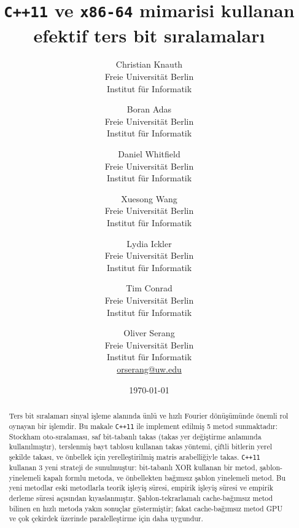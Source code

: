 \documentclass[10pt]{article}
\begin{document}
\title{{\tt C++11} ve {\tt x86-64} mimarisi kullanan efektif ters bit s{\i}ralamalar{\i}}

\author{Christian Knauth\\
Freie Universit\"at Berlin\\
Institut f\"{u}r Informatik
\and
Boran Adas\\
Freie Universit\"at Berlin\\
Institut f\"{u}r Informatik
\and
Daniel Whitfield\\
Freie Universit\"at Berlin\\
Institut f\"{u}r Informatik
\and
Xuesong Wang\\
Freie Universit\"at Berlin\\
Institut f\"{u}r Informatik
\and
Lydia Ickler\\
Freie Universit\"at Berlin\\
Institut f\"{u}r Informatik
\and
Tim Conrad\\
Freie Universit\"at Berlin\\
Institut f\"{u}r Informatik
\and
Oliver Serang\\
Freie Universit\"at Berlin\\
Institut f\"{u}r Informatik\\
\url{orserang@uw.edu}
}

\date{{\small \today}}

\maketitle

\begin{abstract}
\noindent Ters bit s{\i}ralamar{\i} sinyal i\c{s}leme alan{\i}nda \"{u}nl\"{u} ve h{\i}zl{\i} Fourier
 d\"{o}n\"{u}\c{s}\"{u}m\"{u}nde \"{o}nemli rol oynayan bir i\c{s}lemdir. Bu makale {\tt C++11} ile 
 implement edilmi\c{s} 5 metod sunmaktad{\i}r:
Stockham oto-s{\i}ralamas{\i}, saf bit-tabanl{\i} takas
(takas yer de\u{g}i\c{s}tirme anlam{\i}nda kullan{\i}lm{\i}\c{s}t{\i}r), terslenmi\c{s} bayt tablosu
kullanan takas y\"{o}ntemi, \c{c}iftli bitlerin yerel \c{s}ekilde takas{\i}, ve \"{o}nbellek i\c{c}in yerelle\c{s}tirilmi\c{s} matris arabelli\u{g}iyle takas. {\tt C++11} kullanan 3 yeni strateji 
de sunulmu\c{s}tur: bit-tabanl{\i} XOR kullanan bir metod, \c{s}ablon-yinelemeli 
kapal{\i} formlu metoda, ve \"{o}nbellekten ba\u{g}{\i}ms{\i}z \c{s}ablon yinelemeli metod. Bu yeni metodlar eski metodlarla 
teorik i\c{s}leyi\c{s} s\"{u}resi, empirik i\c{s}leyi\c{s} s\"{u}resi ve empirik derleme 
s\"{u}resi a\c{c}{\i}s{\i}ndan k{\i}yaslanm{\i}\c{s}t{\i}r. \c{S}ablon-tekrarlamal{\i} cache-ba\u{g}{\i}ms{\i}z
metod bilinen en h{\i}zl{\i} metoda yak{\i}n sonu\c{c}lar g\"{o}stermi\c{s}tir;
fakat cache-ba\u{g}{\i}ms{\i}z metod GPU ve \c{c}ok \c{c}ekirdek \"{u}zerinde 
paralelle\c{s}tirme i\c{c}in daha uygundur.
\end{abstract}
\end{document}
